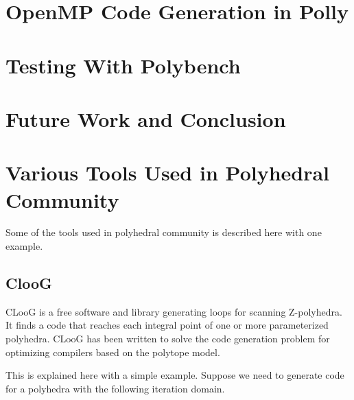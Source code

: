 \documentclass[MTech]{iitmdiss}
\begin{document}
\chapter{OpenMP Code Generation in Polly}


\chapter{Testing With Polybench}

\chapter{Future Work and Conclusion}



%




\appendix
 
\chapter{Various Tools Used in Polyhedral Community}
Some of the tools used in polyhedral community is described here with one example.
\section{ClooG}
CLooG is a free software and library generating loops for scanning Z-polyhedra.
It finds a code that reaches each integral point of one or more parameterized polyhedra.
CLooG has been written to solve the code generation problem for optimizing compilers based on the polytope model.

This is explained here with a simple example. Suppose we need to generate code for
a polyhedra with the following iteration domain.
\end{document}
